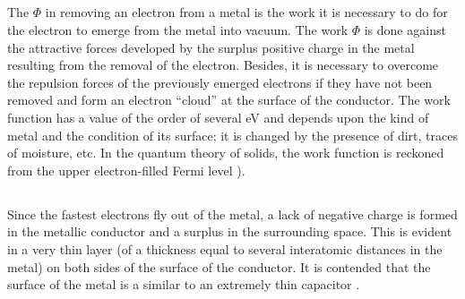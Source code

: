 \subsection{}\label{41.11.1} The  $\Phi$ in removing an electron from a metal is the work it is necessary to do for the electron to emerge from the metal into vacuum. The work $\Phi$ is done against the attractive forces developed by the surplus positive charge in the metal resulting from the removal of the electron. Besides, it is necessary to overcome the repulsion forces of the previously emerged electrons if they have not been removed and form an
electron ``cloud'' at the surface of the conductor. The work
function has a value of the order of several eV and depends upon the kind of metal and the condition of its surface; it is changed by the presence of dirt, traces of moisture, etc. In the quantum theory of solids, the work function is reckoned from the upper electron-filled Fermi level  ).

\subsection{}\label{41.11.2} Since the fastest electrons fly out of the metal, a lack of negative charge is formed in the metallic conductor and a surplus in the surrounding space. This is evident in a very thin layer (of a thickness equal to several interatomic distances in the metal) on both sides of the surface of the conductor. It is contended that the surface of the metal is a similar to an extremely thin capacitor .

